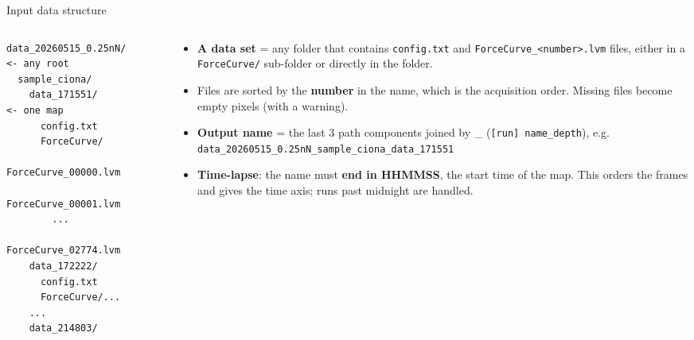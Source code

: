 \documentclass[aspectratio=169,9pt]{beamer}
\begin{document}
\begin{frame}[fragile]{Input data structure}
\begin{columns}[T]
\begin{column}{0.47\textwidth}
\begin{lstlisting}
data_20260515_0.25nN/          <- any root
  sample_ciona/
    data_171551/               <- one map
      config.txt
      ForceCurve/
        ForceCurve_00000.lvm
        ForceCurve_00001.lvm
        ...
        ForceCurve_02774.lvm
    data_172222/
      config.txt
      ForceCurve/...
    ...
    data_214803/
\end{lstlisting}
\end{column}
\begin{column}{0.51\textwidth}\small
\begin{itemize}
\item \textbf{A data set} = any folder that contains \texttt{config.txt} and \texttt{ForceCurve\_<number>.lvm} files, either in a \texttt{ForceCurve/} sub-folder or directly in the folder.
\item Files are sorted by the \textbf{number} in the name, which is the acquisition order. Missing files become empty pixels (with a warning).
\item \textbf{Output name} = the last 3 path components joined by \_ (\texttt{[run] name\_depth}), e.g.\\ \texttt{data\_20260515\_0.25nN\_sample\_ciona\_data\_171551}
\item \textbf{Time-lapse}: the name must \textbf{end in HHMMSS}, the start time of the map. This orders the frames and gives the time axis; runs past midnight are handled.
\end{itemize}
\end{column}
\end{columns}
\end{frame}
\end{document}
